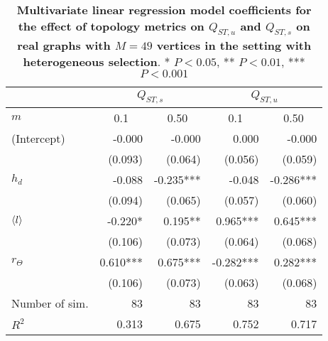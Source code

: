 \begin{table}[ht]
  \begin{center}
    \begin{tabular}{|l||r|r|r|r|}
    \hline
    &       \multicolumn{2}{c|}{$Q_{ST,s}$}                           &               \multicolumn{2}{c|}{$Q_{ST,u}$}        \\ 
\hline
$m$            & \multicolumn{1}{c|}{0.1} & \multicolumn{1}{c|}{0.50} & \multicolumn{1}{c|}{0.1} & \multicolumn{1}{c|}{0.50} \\ 
    \hline\hline
(Intercept) &                  -0.000 &                   -0.000 &                    0.000 &                   -0.000 \\ 
            &                 (0.093) &                  (0.064) &                  (0.056) &                  (0.059) \\ 
$h_d$       &                  -0.088 &                -0.235*** &                   -0.048 &                -0.286*** \\ 
            &                 (0.094) &                  (0.065) &                  (0.057) &                  (0.060) \\ 
$\langle l \rangle$        &                 -0.220* &                  0.195** &                 0.965*** &                 0.645*** \\ 
            &                 (0.106) &                  (0.073) &                  (0.064) &                  (0.068) \\ 
$r_\Theta$  &                0.610*** &                 0.675*** &                -0.282*** &                 0.282*** \\ 
            &                 (0.106) &                  (0.073) &                  (0.063) &                  (0.068) \\ 
\hline\hline
Number of sim.&                    83 &                       83 &                       83 &                       83 \\ 
$R^2$       &                   0.313 &                    0.675 &                    0.752 &                    0.717 \\ 
    \hline 
  \end{tabular}
\end{center}
  \caption{\textbf{Multivariate linear regression model coefficients for the effect of topology metrics on $Q_{ST,u}$ and $Q_{ST,s}$ on real graphs with $M=49$ vertices in the setting with heterogeneous selection}. * $P < 0.05$,  ** $P < 0.01$, *** $P < 0.001$}
\label{tableSI:coefficients_realgraphs}
\end{table}


